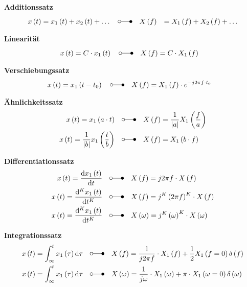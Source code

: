 \newpage
\textbf{Additionssatz}
\begin{align*}
x\left(t\right) &=x_1\left(t\right)+x_2\left(t\right)+\dots \quad \laplace \quad
X\left(f\right) &=X_1\left(f\right)+X_2\left(f\right)+\dots
\end{align*}

\textbf{Linearität}
\begin{align*}
x\left(t\right) &=C\cdot x_1\left(t\right)\quad \laplace \quad X\left(f\right) =C\cdot
X_1\left(f\right)
\end{align*}

\textbf{Verschiebungssatz}
\begin{align*}
x\left(t\right) &=x_1\left(t-t_0\right)\quad \laplace \quad X\left(f\right) =X_1\left(f\right)\cdot
e^{-j2\pi f\cdot t_0}
\end{align*}

\textbf{Ähnlichkeitssatz}
\begin{align*}
x\left(t\right) =x_1\left(a\cdot t\right)\quad &\laplace \quad X\left(f\right)
=\frac{1}{\left|a\right|}X_1\left(\frac{f}{a}\right)\\
x\left(t\right) =\frac{1}{\left|b\right|}x_1\left(\frac{t}{b}\right) \quad &\laplace \quad
X\left(f\right) =X_1\left(b\cdot f\right)
\end{align*}

\textbf{Differentiationssatz}
\begin{align*}
x\left(t\right) =\frac{\diff x_1\left(t\right)}{\diff t} \quad &\laplace \quad X\left(f\right)
=j2\pi f\cdot X\left(f\right)\\
x\left(t\right) =\frac{\diff^K x_1\left(t\right)}{\diff t^K} \quad &\laplace \quad X\left(f\right)
=j^K\left(2\pi f\right)^K\cdot X\left(f\right)\\
x\left(t\right) =\frac{\diff^K x_1\left(t\right)}{\diff t^K} \quad &\laplace \quad
X\left(\omega\right) =j^K\left(\omega\right)^K\cdot X\left(\omega\right)
\end{align*}

\textbf{Integrationssatz}
\begin{align*}
x\left(t\right) =\int_\infty^tx_1\left(\tau\right)\diff\tau \quad &\laplace \quad X\left(f\right)
=\frac{1}{j2\pi f}\cdot X_1\left(f\right)+\frac{1}{2}X_1\left(f=0\right)\delta\left(f\right)\\
x\left(t\right) =\int_\infty^tx_1\left(\tau\right)\diff\tau \quad &\laplace \quad
X\left(\omega\right) =\frac{1}{j \omega}\cdot X_1\left(\omega\right)+\pi\cdot X_1\left(\omega=0\right)\delta\left(\omega\right)
\end{align*}

